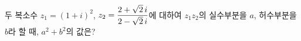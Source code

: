 두 복소수 $z_1=(1+i)^2$, $z_2=\dfrac{2+\sqrt{2}\mkern3mu i}{2-\sqrt{2}\mkern3mu i}$에 대하여 $z_1z_2$의 실수부분을 $a$, 허수부분을 $b$라 할 때, $a^2+b^2$의 값은?
